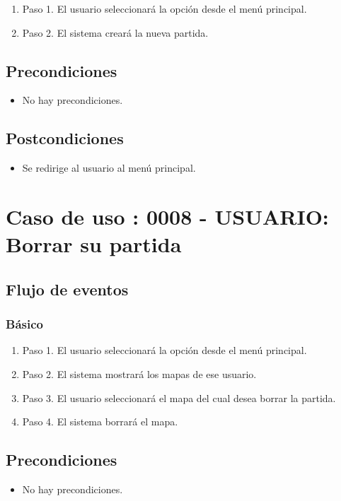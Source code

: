 \begin{enumerate}
\item Paso 1.
El usuario seleccionará la opción desde el menú principal.
\item Paso 2.
El sistema creará la nueva partida.
\end{enumerate}

\subsection{Precondiciones}
\begin{itemize}
\item No hay precondiciones.
\end{itemize}

\subsection{Postcondiciones}
\begin{itemize}
\item Se redirige al usuario al menú principal.
\end{itemize}



\section{Caso de uso : 0008 - USUARIO: Borrar su partida}\label{sec:uc0}
\subsection{Flujo de eventos}
\subsubsection{Básico}

\begin{enumerate}
\item Paso 1.
El usuario seleccionará la opción desde el menú principal.
\item Paso 2.
El sistema mostrará los mapas de ese usuario.
\item Paso 3.
El usuario seleccionará el mapa del cual desea borrar la partida.
\item Paso 4.
El sistema borrará el mapa.
\end{enumerate}

\subsection{Precondiciones}
\begin{itemize}
\item No hay precondiciones.
\end{itemize}

